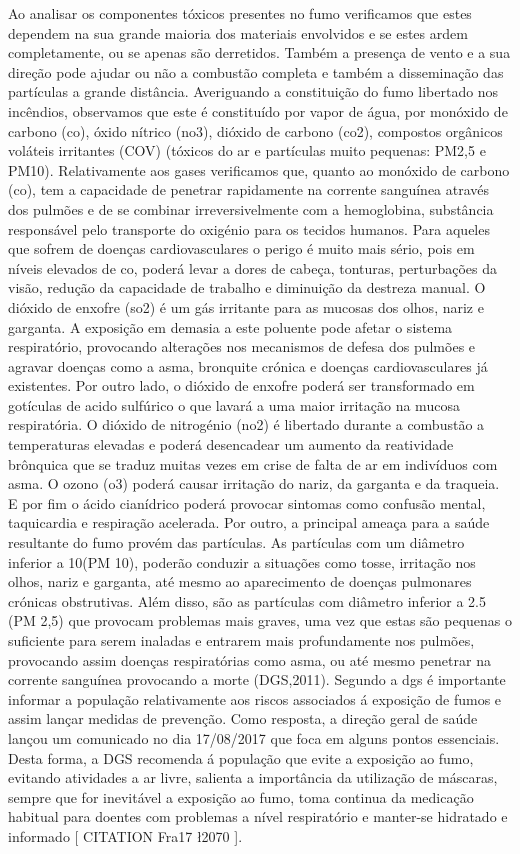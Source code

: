 \documentclass{report}
\begin{document}
Ao analisar os componentes tóxicos presentes no fumo verificamos que estes dependem na sua grande maioria dos materiais envolvidos e se estes ardem completamente, ou se apenas são derretidos. Também a presença de vento e a sua direção pode ajudar ou não a combustão completa e também a disseminação das partículas a grande distância.
 Averiguando a constituição do fumo libertado nos incêndios, observamos que este é constituído por vapor de água, por monóxido de carbono (\ac{co}), óxido nítrico (\ac{no3}), dióxido de carbono (\ac{co2}), compostos orgânicos voláteis irritantes (COV) (tóxicos do ar e partículas muito pequenas: PM2,5 e PM10).
Relativamente aos gases verificamos que, quanto ao monóxido de carbono (\ac{co}), tem a capacidade de penetrar rapidamente na corrente sanguínea através dos pulmões e de se combinar irreversivelmente com a hemoglobina, substância responsável pelo transporte do oxigénio para os tecidos humanos. Para aqueles que sofrem de doenças cardiovasculares o perigo é muito mais sério, pois em níveis elevados de \ac{co}, poderá levar a dores de cabeça, tonturas, perturbações da visão, redução da capacidade de trabalho e diminuição da destreza manual.
O dióxido de enxofre (\ac{so2}) é um gás irritante para as mucosas dos olhos, nariz e garganta. A exposição em demasia a este poluente pode afetar o sistema respiratório, provocando alterações nos mecanismos de defesa dos pulmões e agravar doenças como a asma, bronquite crónica e doenças cardiovasculares já existentes. Por outro lado, o dióxido de enxofre poderá ser transformado em gotículas de acido sulfúrico o que lavará a uma maior irritação na mucosa respiratória.
O dióxido de nitrogénio (\ac{no2}) é libertado durante a combustão a temperaturas elevadas e poderá desencadear um aumento da reatividade brônquica que se traduz muitas vezes em crise de falta de ar em indivíduos com asma. 
O ozono (\ac{o3}) poderá causar irritação do nariz, da garganta e da traqueia. E por fim o ácido cianídrico poderá provocar sintomas como confusão mental, taquicardia e respiração acelerada. 
Por outro, a principal ameaça para a saúde resultante do fumo provém das partículas. As partículas com um diâmetro inferior a 10\micro\meter (PM 10), poderão conduzir a situações como tosse, irritação nos olhos, nariz e garganta, até mesmo ao aparecimento de doenças pulmonares crónicas obstrutivas. Além disso, são as partículas com diâmetro inferior a 2.5 \micro\meter (PM 2,5) que provocam problemas mais graves, uma vez que estas são pequenas o suficiente para serem inaladas e entrarem mais profundamente nos pulmões, provocando assim doenças respiratórias como asma, ou até mesmo penetrar na corrente sanguínea provocando a morte (DGS,2011).
Segundo a \ac{dgs} é importante informar a população relativamente aos riscos associados á exposição de fumos e assim lançar medidas de prevenção. Como resposta, a direção geral de saúde lançou um comunicado no dia 17/08/2017 que foca em alguns pontos essenciais. Desta forma, a DGS recomenda á população que evite a exposição ao fumo, evitando atividades a ar livre, salienta a importância da utilização de máscaras, sempre que for inevitável a exposição ao fumo, toma continua da medicação habitual para doentes com problemas a nível respiratório e manter-se hidratado e informado [ CITATION Fra17 \l 2070 ].
\end{document}

